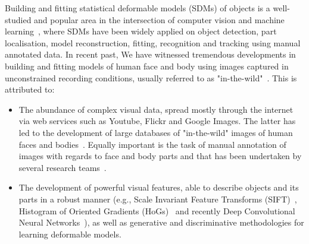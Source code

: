 Building and fitting statistical deformable models (SDMs) of objects is a well-studied and popular area in the intersection of computer vision and machine learning~\cite{Cootes1995, Cootes2001, Matthews2004, Saragih2011, Belhumeur2011, Zhu2012, Xiong2013}, where SDMs have been widely applied on object detection, part localisation, model reconstruction, fitting, recognition and tracking using manual annotated data. In recent past, We have witnessed tremendous developments in building and fitting models of human face and body using images captured in unconstrained recording conditions, usually referred to as "in-the-wild"~\cite{Belhumeur2011, Cao2012, Zhu2012, Xiong2013, Asthana2013, Tzimiropoulos2014, Asthana2014}. This is attributed to: 
\begin{itemize}

\item The abundance of complex visual data, spread mostly through the internet via web services such as Youtube, Flickr and Google Images. The latter has led to the development of large databases of "in-the-wild" images of human faces and bodies~\cite{Belhumeur2011, Le2012, Zhu2012, Burgos2013}. Equally important is the task of manual annotation of images with regards to face and body parts and that has been undertaken by several research teams~\cite{sagonas_iccv_300w_2013}.

\item The development of powerful visual features, able to describe objects and its parts in a robust manner (e.g., Scale Invariant Feature Transforms (SIFT)~\cite{lowe1999object}, Histogram of Oriented Gradients (HoGs)~\cite{Dalal2005} and recently Deep Convolutional Neural Networks~\cite{sermanet2013overfeat}), as well as generative and discriminative methodologies for learning deformable models. 

\end{itemize}

